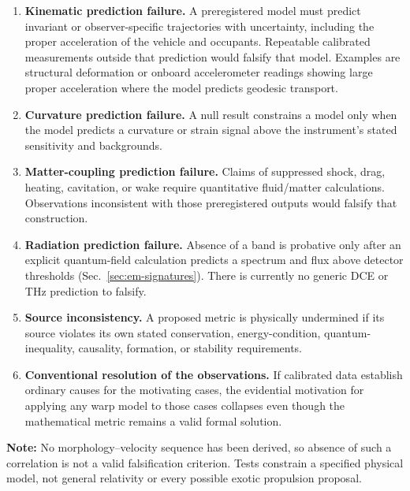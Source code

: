 \documentclass[aps,prd,twocolumn,superscriptaddress,nofootinbib,floatfix]{revtex4-2}
\begin{document}
\begin{enumerate}
  \item \textbf{Kinematic prediction failure.} A preregistered model must predict
    invariant or observer-specific trajectories with uncertainty, including the
    proper acceleration of the vehicle and occupants. Repeatable calibrated
    measurements outside that prediction would falsify that model. Examples are
    structural deformation or onboard accelerometer readings showing large proper
    acceleration where the model predicts geodesic transport.
  \item \textbf{Curvature prediction failure.} A null result constrains a model
    only when the model predicts a curvature or strain signal above the
    instrument's stated sensitivity and backgrounds.
  \item \textbf{Matter-coupling prediction failure.} Claims of suppressed shock,
    drag, heating, cavitation, or wake require quantitative fluid/matter
    calculations. Observations inconsistent with those preregistered outputs
    would falsify that construction.
  \item \textbf{Radiation prediction failure.} Absence of a band is probative only
    after an explicit quantum-field calculation predicts a spectrum and flux
    above detector thresholds (Sec.~\ref{sec:em-signatures}). There is currently
    no generic DCE or THz prediction to falsify.
  \item \textbf{Source inconsistency.} A proposed metric is physically undermined
    if its source violates its own stated conservation, energy-condition,
    quantum-inequality, causality, formation, or stability requirements.
  \item \textbf{Conventional resolution of the observations.} If calibrated data
    establish ordinary causes for the motivating cases, the evidential motivation
    for applying any warp model to those cases collapses even though the
    mathematical metric remains a valid formal solution.
\end{enumerate}

\textbf{Note:} No morphology--velocity sequence has been derived, so absence of
such a correlation is not a valid falsification criterion. Tests constrain a
specified physical model, not general relativity or every possible exotic
propulsion proposal.
\end{document}
